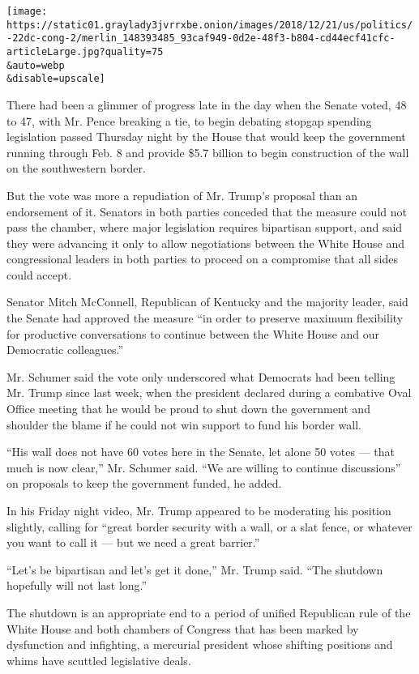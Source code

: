 \texttt{[image: https://static01.graylady3jvrrxbe.onion/images/2018/12/21/us/politics/-22dc-cong-2/merlin\_148393485\_93caf949-0d2e-48f3-b804-cd44ecf41cfc-articleLarge.jpg?quality=75\\\&auto=webp\\\&disable=upscale]}

There had been a glimmer of progress late in the day when the Senate
voted, 48 to 47, with Mr. Pence breaking a tie, to begin debating
stopgap spending legislation passed Thursday night by the House that
would keep the government running through Feb. 8 and provide \$5.7
billion to begin construction of the wall on the southwestern border.

But the vote was more a repudiation of Mr. Trump's proposal than an
endorsement of it. Senators in both parties conceded that the measure
could not pass the chamber, where major legislation requires bipartisan
support, and said they were advancing it only to allow negotiations
between the White House and congressional leaders in both parties to
proceed on a compromise that all sides could accept.

Senator Mitch McConnell, Republican of Kentucky and the majority leader,
said the Senate had approved the measure ``in order to preserve maximum
flexibility for productive conversations to continue between the White
House and our Democratic colleagues.''

Mr. Schumer said the vote only underscored what Democrats had been
telling Mr. Trump since last week, when the president declared during a
combative Oval Office meeting that he would be proud to shut down the
government and shoulder the blame if he could not win support to fund
his border wall.

``His wall does not have 60 votes here in the Senate, let alone 50 votes
--- that much is now clear,'' Mr. Schumer said. ``We are willing to
continue discussions'' on proposals to keep the government funded, he
added.

In his Friday night video, Mr. Trump appeared to be moderating his
position slightly, calling for ``great border security with a wall, or a
slat fence, or whatever you want to call it --- but we need a great
barrier.''

``Let's be bipartisan and let's get it done,'' Mr. Trump said. ``The
shutdown hopefully will not last long.''

The shutdown is an appropriate end to a period of unified Republican
rule of the White House and both chambers of Congress that has been
marked by dysfunction and infighting, a mercurial president whose
shifting positions and whims have scuttled legislative deals.

